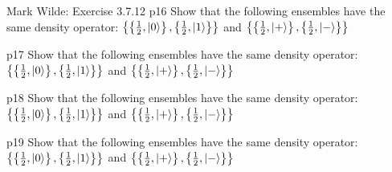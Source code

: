 \documentclass[a4paper, 11pt]{article}
\begin{document}
\begin{problem}{%
		Mark Wilde: Exercise 3.7.12
	}{p16%
	}
	Show that the following ensembles have the same density operator: $\left\{\left\{\frac12,\ket{0}\right\},\left\{\frac12,\ket{1}\right\}\right\}$ and $\left\{\left\{\frac12,\ket{+}\right\},\left\{\frac12,\ket{-}\right\}\right\}$
\end{problem}


\begin{problem}{%
	}{p17%
	}
	Show that the following ensembles have the same density operator: $\left\{\left\{\frac12,\ket{0}\right\},\left\{\frac12,\ket{1}\right\}\right\}$ and $\left\{\left\{\frac12,\ket{+}\right\},\left\{\frac12,\ket{-}\right\}\right\}$
\end{problem}


\begin{problem}{%
	}{p18%
	}
	Show that the following ensembles have the same density operator: $\left\{\left\{\frac12,\ket{0}\right\},\left\{\frac12,\ket{1}\right\}\right\}$ and $\left\{\left\{\frac12,\ket{+}\right\},\left\{\frac12,\ket{-}\right\}\right\}$
\end{problem}


\begin{problem}{%
	}{p19%
	}
	Show that the following ensembles have the same density operator: $\left\{\left\{\frac12,\ket{0}\right\},\left\{\frac12,\ket{1}\right\}\right\}$ and $\left\{\left\{\frac12,\ket{+}\right\},\left\{\frac12,\ket{-}\right\}\right\}$
\end{problem}
\end{document}
